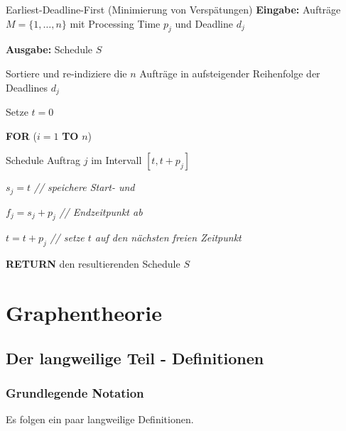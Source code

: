 \documentclass{panikzettel}
\newcommand\tab[1][1cm]{\hspace*{#1}}
\begin{document}
\begin{algo}{Earliest-Deadline-First (Minimierung von Verspätungen)}
	\textbf{Eingabe:} Aufträge $M= \{1, \dots , n\}$ mit Processing Time $p_j$ und Deadline $d_j$
	
	\textbf{Ausgabe:} Schedule $S$ 
	
	\tcblower
	
	Sortiere und re-indiziere die $n$ Aufträge in aufsteigender Reihenfolge der Deadlines $d_j$
	
	Setze $t=0$
	
	\textbf{FOR} ($i = 1$ \textbf{TO} $n$)
	
	\tab Schedule Auftrag $j$ im Intervall $[t, t+ p_j]$
	
	\tab $s_j = t$ \textit{ \color{gray} // speichere Start- und }
	
	\tab $f_j = s_j + p_j$  \textit{ \color{gray} // Endzeitpunkt ab }
	
	\tab $t = t + p_j$  \textit{ \color{gray} // setze $t$ auf den nächsten freien Zeitpunkt }
	
	
	\textbf{RETURN} den resultierenden Schedule $S$
\end{algo}

\newpage
\section{Graphentheorie} \label{graphtheorie}

\subsection{Der langweilige Teil - Definitionen}

\subsubsection{Grundlegende Notation}

Es folgen ein paar langweilige Definitionen.
\end{document}
